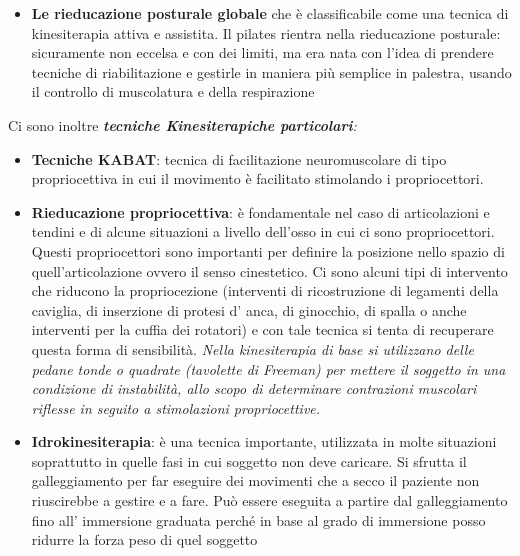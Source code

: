 \documentclass[]{article}
\begin{document}
\begin{itemize}
\item
  \textbf{Le rieducazione posturale globale} che è classificabile come
  una tecnica di kinesiterapia attiva e assistita. Il pilates rientra
  nella rieducazione posturale: sicuramente non eccelsa e con dei
  limiti, ma era nata con l'idea di prendere tecniche di riabilitazione
  e gestirle in maniera più semplice in palestra, usando il controllo di
  muscolatura e della respirazione
\end{itemize}

Ci sono inoltre \emph{\textbf{tecniche Kinesiterapiche particolari}:}

\begin{itemize}
\item
  \textbf{Tecniche KABAT}: tecnica di facilitazione neuromuscolare di
  tipo propriocettiva in cui il movimento è facilitato stimolando i
  propriocettori.
\item
  \textbf{Rieducazione propriocettiva}: è fondamentale nel caso di
  articolazioni e tendini e di alcune situazioni a livello dell'osso in
  cui ci sono propriocettori. Questi propriocettori sono importanti per
  definire la posizione nello spazio di quell'articolazione ovvero il
  senso cinestetico. Ci sono alcuni tipi di intervento che riducono la
  propriocezione (interventi di ricostruzione di legamenti della
  caviglia, di inserzione di protesi d' anca, di ginocchio, di spalla o
  anche interventi per la cuffia dei rotatori) e con tale tecnica si
  tenta di recuperare questa forma di sensibilità. \emph{Nella
  kinesiterapia di base si utilizzano delle pedane tonde o quadrate
  (tavolette di Freeman) per mettere il soggetto in una condizione di
  instabilità, allo scopo di determinare contrazioni muscolari riflesse
  in seguito a stimolazioni propriocettive.}
\end{itemize}

\begin{itemize}
\item
  \textbf{Idrokinesiterapia}: è una tecnica importante, utilizzata in
  molte situazioni soprattutto in quelle fasi in cui soggetto non deve
  caricare. Si sfrutta il galleggiamento per far eseguire dei movimenti
  che a secco il paziente non riuscirebbe a gestire e a fare. Può essere
  eseguita a partire dal galleggiamento fino all' immersione graduata
  perché in base al grado di immersione posso ridurre la forza peso di
  quel soggetto
\end{itemize}
\end{document}
